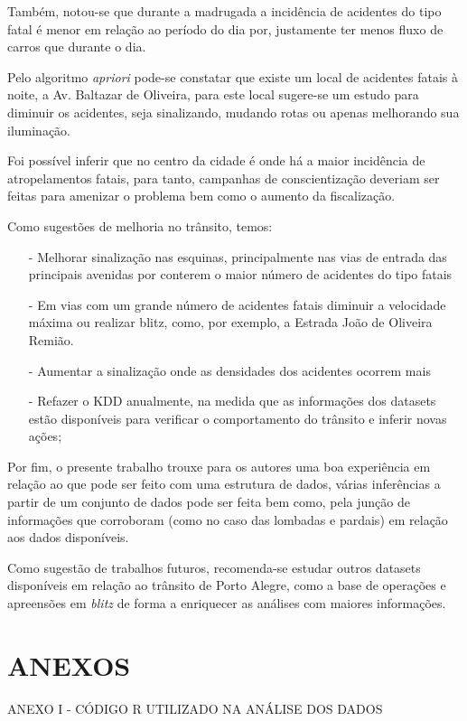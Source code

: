 \documentclass[11pt,article,oneside,a4paper]{abntex2}
\begin{document}
Também, notou-se que durante a madrugada a incidência de acidentes do tipo fatal é menor em relação ao período do dia por, justamente ter menos fluxo de carros que durante o dia. 

Pelo algoritmo \textit{apriori} pode-se constatar que existe um local de acidentes fatais à noite, a Av. Baltazar de Oliveira, para este local sugere-se um estudo para diminuir os acidentes, seja sinalizando, mudando rotas ou apenas melhorando sua iluminação. 

Foi possível inferir que no centro da cidade é onde há a maior incidência de atropelamentos fatais, para tanto, campanhas de conscientização deveriam ser feitas para amenizar o problema bem como o aumento da fiscalização.

Como sugestões de melhoria no trânsito, temos:

\begin{itemize}
	\item[-] Melhorar sinalização nas esquinas, principalmente nas vias de entrada das principais avenidas por conterem o maior número de acidentes do tipo fatais
	\item[-] Em vias com um grande número de acidentes fatais diminuir a velocidade máxima ou realizar blitz, como, por exemplo, a Estrada João de Oliveira Remião.
	\item[-] Aumentar a sinalização onde as densidades dos acidentes ocorrem mais
	\item[-] Refazer o KDD anualmente, na medida que as informações dos datasets estão disponíveis para verificar o comportamento do trânsito e inferir novas ações;
\end{itemize}

Por fim, o presente trabalho trouxe para os autores uma boa experiência em relação ao que pode ser feito com uma estrutura de dados, várias inferências a partir de um conjunto de dados pode ser feita bem como, pela junção de informações que corroboram (como no caso das lombadas e pardais) em relação aos dados disponíveis.

Como sugestão de trabalhos futuros, recomenda-se estudar outros datasets disponíveis em relação ao trânsito de Porto Alegre, como a base de operações e apreensões em \textit{blitz} de forma a enriquecer as análises com maiores informações. 

\newpage
\section*{ANEXOS}
ANEXO I - CÓDIGO R UTILIZADO NA ANÁLISE DOS DADOS
\end{document}
